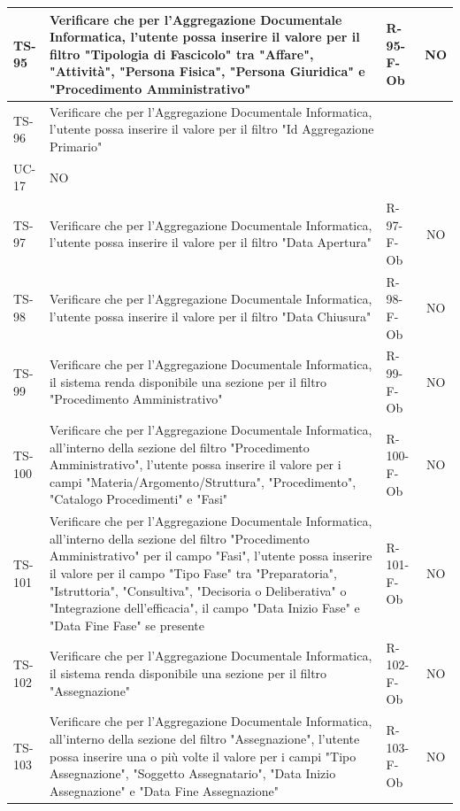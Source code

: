 \documentclass[a4paper,12pt]{article}
\begin{document}
\begin{longtable}{|p{1.5cm}|p{8.3cm}|p{2.4cm}|c|}
\hline
TS-95 & Verificare che per l'Aggregazione Documentale Informatica, l'utente possa inserire il valore per il filtro "Tipologia di Fascicolo" tra "Affare", "Attività", "Persona Fisica", "Persona Giuridica" e "Procedimento Amministrativo" & R-95-F-Ob & NO \\
\hline
TS-96 & Verificare che per l'Aggregazione Documentale Informatica, l'utente possa inserire il valore per il filtro "Id Aggregazione Primario" & \begin{tabular}[t]{@{}l} R-96-F-Ob \\ UC-17 \end{tabular} & NO \\
\hline
TS-97 & Verificare che per l'Aggregazione Documentale Informatica, l'utente possa inserire il valore per il filtro "Data Apertura" & R-97-F-Ob & NO \\
\hline
TS-98 & Verificare che per l'Aggregazione Documentale Informatica, l'utente possa inserire il valore per il filtro "Data Chiusura" & R-98-F-Ob & NO \\
\hline
TS-99 & Verificare che per l'Aggregazione Documentale Informatica, il sistema renda disponibile una sezione per il filtro "Procedimento Amministrativo" & R-99-F-Ob & NO \\
\hline
TS-100 & Verificare che per l'Aggregazione Documentale Informatica, all'interno della sezione del filtro "Procedimento Amministrativo", l'utente possa inserire il valore per i campi "Materia/Argomento/Struttura", "Procedimento", "Catalogo Procedimenti" e "Fasi" & R-100-F-Ob & NO \\
\hline
TS-101 & Verificare che per l'Aggregazione Documentale Informatica, all'interno della sezione del filtro "Procedimento Amministrativo" per il campo "Fasi", l'utente possa inserire il valore per il campo "Tipo Fase" tra "Preparatoria", "Istruttoria", "Consultiva", "Decisoria o Deliberativa" o "Integrazione dell'efficacia", il campo "Data Inizio Fase" e "Data Fine Fase" se presente & R-101-F-Ob & NO \\
\hline
TS-102 & Verificare che per l'Aggregazione Documentale Informatica, il sistema renda disponibile una sezione per il filtro "Assegnazione" & R-102-F-Ob & NO \\
\hline
TS-103 & Verificare che per l'Aggregazione Documentale Informatica, all'interno della sezione del filtro "Assegnazione", l'utente possa inserire una o più volte il valore per i campi "Tipo Assegnazione", "Soggetto Assegnatario", "Data Inizio Assegnazione" e "Data Fine Assegnazione" & R-103-F-Ob & NO \\

\end{longtable}
\end{document}
